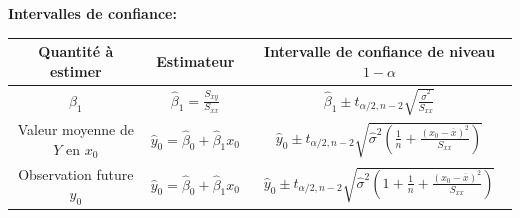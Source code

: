 \documentclass[12pt,french]{article}
\begin{document}
\vspace{0.3cm}
\textbf{Intervalles de confiance:}
\vspace{0.2cm}

{\renewcommand{\arraystretch}{2.4}
\begin{tabular}{|c|c|c|}
\hline Quantité \`a estimer & Estimateur & Intervalle de
confiance de niveau $1-\alpha$\\\hline

\hline $\beta_1$ & $\displaystyle \hat{\beta}_1 =\frac{
S_{xy}}{S_{xx}}$& $\hat{\beta}_1 \pm t_{\alpha/2,n-2}
\sqrt{\displaystyle{\frac{\hat{\sigma}^2}{S_{xx}}}}$ \\[.20cm]

\hline
Valeur moyenne de $Y$ en $x_0$ & $\hat y_0=\hat{\beta}_0 +\hat{\beta}_1 x_0$
& $\hat y_0 \pm t_{\alpha/2,n-2}\sqrt{\hat{\sigma}^2\left(\displaystyle{\frac{1}{n} + \frac{(x_0 -\overline{x})^2}{S_{xx}}}\right)}$ \\[.20cm]

\hline Observation future $y_0$ & $\hat y_0=\hat{\beta}_0 +
\hat{\beta}_1 x_0$ & $\hat y_0 \pm t_{\alpha/2,n-2}
\sqrt{\hat{\sigma}^2\left(\displaystyle{1 + \frac{1}{n} + \frac{(x_0 -
\overline{x})^2}{S_{xx}}}\right)}$ \\[.20cm]

\hline
\end{tabular}
}

\newpage

\end{document}
